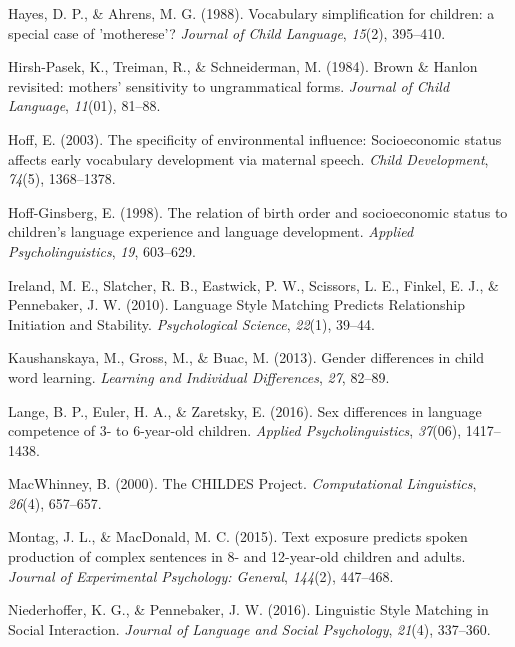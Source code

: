 \documentclass[10pt, letterpaper]{article}
\begin{document}
\leavevmode\hypertarget{ref-Hayes:1988ue}{}%
Hayes, D. P., \& Ahrens, M. G. (1988). Vocabulary simplification for
children: a special case of 'motherese'? \emph{Journal of Child
Language}, \emph{15}(2), 395--410.

\leavevmode\hypertarget{ref-HirshPasek:1984bd}{}%
Hirsh-Pasek, K., Treiman, R., \& Schneiderman, M. (1984). Brown \&
Hanlon revisited: mothers' sensitivity to ungrammatical forms.
\emph{Journal of Child Language}, \emph{11}(01), 81--88.

\leavevmode\hypertarget{ref-Hoff:2003kx}{}%
Hoff, E. (2003). The specificity of environmental influence:
Socioeconomic status affects early vocabulary development via maternal
speech. \emph{Child Development}, \emph{74}(5), 1368--1378.

\leavevmode\hypertarget{ref-HoffGinsberg:2008up}{}%
Hoff-Ginsberg, E. (1998). The relation of birth order and socioeconomic
status to children's language experience and language development.
\emph{Applied Psycholinguistics}, \emph{19}, 603--629.

\leavevmode\hypertarget{ref-Ireland:2010gl}{}%
Ireland, M. E., Slatcher, R. B., Eastwick, P. W., Scissors, L. E.,
Finkel, E. J., \& Pennebaker, J. W. (2010). Language Style Matching
Predicts Relationship Initiation and Stability. \emph{Psychological
Science}, \emph{22}(1), 39--44.

\leavevmode\hypertarget{ref-Kaushanskaya:2013gi}{}%
Kaushanskaya, M., Gross, M., \& Buac, M. (2013). Gender differences in
child word learning. \emph{Learning and Individual Differences},
\emph{27}, 82--89.

\leavevmode\hypertarget{ref-Lange:2016gv}{}%
Lange, B. P., Euler, H. A., \& Zaretsky, E. (2016). Sex differences in
language competence of 3- to 6-year-old children. \emph{Applied
Psycholinguistics}, \emph{37}(06), 1417--1438.

\leavevmode\hypertarget{ref-MacWhinney:2000jx}{}%
MacWhinney, B. (2000). The CHILDES Project. \emph{Computational
Linguistics}, \emph{26}(4), 657--657.

\leavevmode\hypertarget{ref-Montag:2015iy}{}%
Montag, J. L., \& MacDonald, M. C. (2015). Text exposure predicts spoken
production of complex sentences in 8- and 12-year-old children and
adults. \emph{Journal of Experimental Psychology: General},
\emph{144}(2), 447--468.

\leavevmode\hypertarget{ref-Niederhoffer:2016co}{}%
Niederhoffer, K. G., \& Pennebaker, J. W. (2016). Linguistic Style
Matching in Social Interaction. \emph{Journal of Language and Social
Psychology}, \emph{21}(4), 337--360.
\end{document}
